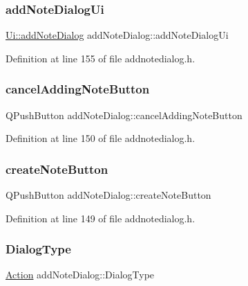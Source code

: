 \subsubsection{\texorpdfstring{add\+Note\+Dialog\+Ui}{addNoteDialogUi}}
{\footnotesize\ttfamily \hyperlink{classUi_1_1addNoteDialog}{Ui\+::add\+Note\+Dialog} add\+Note\+Dialog\+::add\+Note\+Dialog\+Ui\hspace{0.3cm}{\ttfamily [private]}}



Definition at line 155 of file addnotedialog.\+h.

\hypertarget{classaddNoteDialog_a05ecc54eb7cba0d6ffbc5cabc8a4f551}{}\label{classaddNoteDialog_a05ecc54eb7cba0d6ffbc5cabc8a4f551} 
\subsubsection{\texorpdfstring{cancel\+Adding\+Note\+Button}{cancelAddingNoteButton}}
{\footnotesize\ttfamily Q\+Push\+Button add\+Note\+Dialog\+::cancel\+Adding\+Note\+Button}



Definition at line 150 of file addnotedialog.\+h.

\hypertarget{classaddNoteDialog_ae424f90e2d41fa5ec323d4c93a91f527}{}\label{classaddNoteDialog_ae424f90e2d41fa5ec323d4c93a91f527} 
\subsubsection{\texorpdfstring{create\+Note\+Button}{createNoteButton}}
{\footnotesize\ttfamily Q\+Push\+Button add\+Note\+Dialog\+::create\+Note\+Button}



Definition at line 149 of file addnotedialog.\+h.

\hypertarget{classaddNoteDialog_a6fac1eca29bdb022bad56ca2e8938846}{}\label{classaddNoteDialog_a6fac1eca29bdb022bad56ca2e8938846} 
\subsubsection{\texorpdfstring{Dialog\+Type}{DialogType}}
{\footnotesize\ttfamily \hyperlink{addnotedialog_8h_a8bb1ef53467e4f61410d12822d922498}{Action} add\+Note\+Dialog\+::\+Dialog\+Type\hspace{0.3cm}{\ttfamily [private]}}



